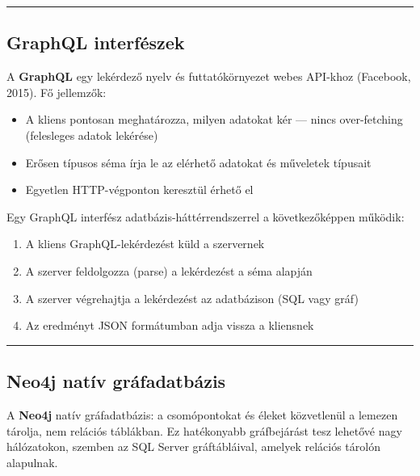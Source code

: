 \documentclass[
  magyar,
]{article}
\providecommand{\tightlist}{%
  \setlength{\itemsep}{0pt}\setlength{\parskip}{0pt}}
\begin{document}
\begin{center}\rule{0.5\linewidth}{0.5pt}\end{center}

\subsection{GraphQL interfészek}\label{graphql-interfuxe9szek}

A \textbf{GraphQL} egy lekérdező nyelv és futtatókörnyezet webes
API-khoz (Facebook, 2015). Fő jellemzők:

\begin{itemize}
\tightlist
\item
  A kliens pontosan meghatározza, milyen adatokat kér --- nincs
  over-fetching (felesleges adatok lekérése)
\item
  Erősen típusos séma írja le az elérhető adatokat és műveletek típusait
\item
  Egyetlen HTTP-végponton keresztül érhető el
\end{itemize}

Egy GraphQL interfész adatbázis-háttérrendszerrel a következőképpen
működik:

\begin{enumerate}
\def\labelenumi{\arabic{enumi}.}
\tightlist
\item
  A kliens GraphQL-lekérdezést küld a szervernek
\item
  A szerver feldolgozza (parse) a lekérdezést a séma alapján
\item
  A szerver végrehajtja a lekérdezést az adatbázison (SQL vagy gráf)
\item
  Az eredményt JSON formátumban adja vissza a kliensnek
\end{enumerate}

\begin{center}\rule{0.5\linewidth}{0.5pt}\end{center}

\subsection{Neo4j natív
gráfadatbázis}\label{neo4j-natuxedv-gruxe1fadatbuxe1zis}

A \textbf{Neo4j} natív gráfadatbázis: a csomópontokat és éleket
közvetlenül a lemezen tárolja, nem relációs táblákban. Ez hatékonyabb
gráfbejárást tesz lehetővé nagy hálózatokon, szemben az SQL Server
gráftábláival, amelyek relációs tárolón alapulnak.
\end{document}

